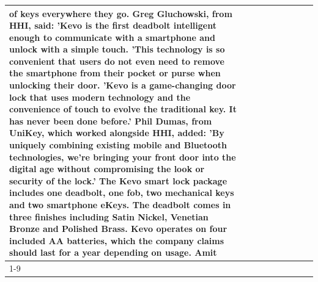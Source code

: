 \begin{table}[H]
\begin{tabular}{lllrlllll}
of keys everywhere they go. Greg Gluchowski, from HHI, said: 'Kevo is the first deadbolt intelligent enough to communicate with a smartphone and unlock with a simple touch. 'This technology is so convenient that users do not even need to remove the smartphone from their pocket or purse when unlocking their door. 'Kevo is a game-changing door lock that uses modern technology and the convenience of touch to evolve the traditional key. It has never been done before.' Phil Dumas, from UniKey, which worked alongside HHI, added: 'By uniquely combining existing mobile and Bluetooth technologies, we’re bringing your front door into the digital age without compromising the look or security of the lock.' The Kevo smart lock package includes one deadbolt, one fob, two mechanical keys and two smartphone eKeys. The deadbolt comes in three finishes including Satin Nickel, Venetian Bronze and Polished Brass. Kevo operates on four included AA batteries, which the company claims should last for a year depending on usage. Amit \\
\cline{1-9}

\end{tabular}
\end{table}
